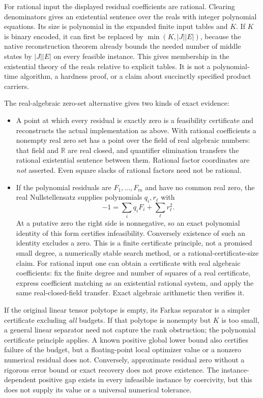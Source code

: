 For rational input the displayed residual coefficients are rational.
Clearing denominators gives an existential sentence over the reals with
integer polynomial equations. Its size is polynomial in the expanded
finite input tables and $K$. If $K$ is binary encoded, it can first be
replaced by $\min(K,|J||E|)$, because the native reconstruction theorem
already bounds the needed number of middle states by $|J||E|$ on every
feasible instance. This gives membership in the existential theory of the
reals relative to explicit tables. It is not a polynomial-time algorithm,
a hardness proof, or a claim about succinctly specified product carriers.

The real-algebraic zero-set alternative gives two kinds of exact evidence:
\begin{itemize}
\item A point at which every residual is exactly zero is a feasibility
certificate and reconstructs the actual implementation as above. With
rational coefficients a nonempty real zero set has a point over the field
of real algebraic numbers: that field and $\mathbb R$ are real closed, and
quantifier elimination transfers the rational existential sentence between
them. Rational factor coordinates are \emph{not} asserted. Even square
slacks of rational factors need not be rational.
\item If the polynomial residuals are $F_1,\ldots,F_m$ and have no common
real zero, the real Nullstellensatz supplies polynomials $q_i,r_\ell$ with
\begin{equation}\label{eq:budget-nullstellensatz}
 -1=\sum_iq_iF_i+\sum_\ell r_\ell^2.
\end{equation}
At a putative zero the right side is nonnegative, so an exact polynomial
identity of this form certifies infeasibility. Conversely existence of
such an identity excludes a zero. This is a finite certificate principle,
not a promised small degree, a numerically stable search method, or a
rational-certificate-size claim. For rational input one can obtain a
certificate with real algebraic coefficients: fix the finite degree and
number of squares of a real certificate, express coefficient matching as
an existential rational system, and apply the same real-closed-field
transfer. Exact algebraic arithmetic then verifies it.
\end{itemize}
If the original linear tensor polytope is empty, its Farkas separator is a
simpler certificate excluding \emph{all} budgets. If that polytope is
nonempty but $K$ is too small, a general linear separator need not capture
the rank obstruction; the polynomial certificate principle applies.
A known positive global lower bound also certifies failure of the budget,
but a floating-point local optimizer value or a nonzero numerical residual
does not. Conversely, approximate residual zero without a rigorous error
bound or exact recovery does not prove existence. The instance-dependent
positive gap exists in every infeasible instance by coercivity, but this
does not supply its value or a universal numerical tolerance.

